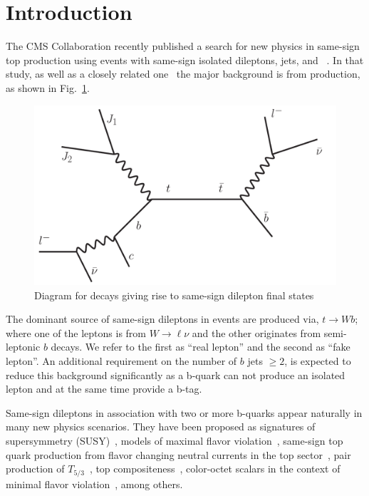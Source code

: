 \section{Introduction}
\label{sec:intro}
The CMS Collaboration recently published a search for new physics
in same-sign top production using events with same-sign isolated dileptons, jets, and \met~\cite{sstop}. 
In that study, as well as a closely related one~\cite{sspaper} the major
background is from \ttbar production, as shown in Fig.~\ref{fig:ttbar}.

\begin{figure}[htb]
\begin{center}
\includegraphics[width=0.6\linewidth, height=0.35\linewidth]{figs/ttbar.pdf}
\caption{ Diagram for \ttbar decays giving rise to same-sign dilepton final states \label{fig:ttbar}}
\end{center}
\end{figure}

The dominant source of same-sign dileptons in \ttbar events are produced via, $t \rightarrow W b$; where 
one of the leptons is from $W \rightarrow \ell \nu $ and the other originates from semi-leptonic $b$ decays. 
We refer to the first as ``real lepton'' and the second as ``fake lepton''.
An additional requirement on the number of $b$ jets $\geq 2$, is expected to reduce this background significantly
as a b-quark can not produce an isolated lepton and at the same time provide a b-tag.

Same-sign dileptons in association with two or more b-quarks appear naturally in many new physics scenarios.
They have been proposed as signatures of supersymmetry 
(SUSY)~\cite{stopVirtual,stopReal,
sgluons,wacker,naturalness1,naturalness2,naturalness3,naturalness4}, 
models of maximal flavor violation~\cite{mxflv1,mxflv2,mxflv3}, 
same-sign top quark production from flavor changing neutral currents in the top sector~\cite{fcnczprime}, 
pair production of $T_{5/3}$~\cite{t53},
top compositeness~\cite{topcomp1,topcomp2,topcomp3},
color-octet scalars in the context of minimal flavor violation~\cite{colorOctetScalars}, 
among others.

